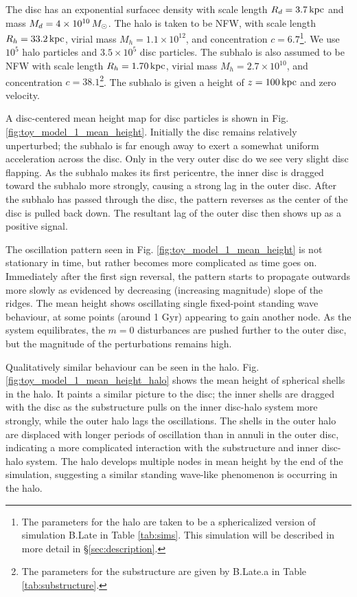 The disc has an exponential surfacec density with scale length $R_d=3.7\,\text{kpc}$ and mass $M_d=4\times10^{10} \,M_\odot$. The halo is taken to be NFW, with scale length $R_h=33.2\,\text{kpc}$, virial mass $M_h=1.1\times10^{12}$, and concentration $c=6.7$\footnote{The parameters for the halo are taken to be a sphericalized version of simulation B.Late in Table \ref{tab:sims}. This simulation will be described in more detail in \S\ref{sec:description}.}. We use $10^5$ halo particles and $3.5 \times 10^{5}$ disc particles. The subhalo is also assumed to be NFW with scale length $R_h=1.70\,\text{kpc}$, virial mass $M_h=2.7\times10^{10}$, and concentration $c=38.1$\footnote{ The parameters for the substructure are given by B.Late.a in Table \ref{tab:substructure}.}. The subhalo is given a height of $z=100\,\text{kpc}$ and zero velocity.



A disc-centered mean height map for disc particles is shown in Fig. \ref{fig:toy_model_1_mean_height}. Initially the disc remains relatively unperturbed; the subhalo is far enough away to exert a somewhat uniform acceleration across the disc. Only in the very outer disc do we see very slight disc flapping. As the subhalo makes its first pericentre, the inner disc is dragged toward the subhalo more strongly, causing a strong lag in the outer disc. After the subhalo has passed through the disc, the pattern reverses as the center of the disc is pulled back down. The resultant lag of the outer disc then shows up as a positive signal.



The oscillation pattern seen in Fig. \ref{fig:toy_model_1_mean_height} is not stationary in time, but rather becomes more complicated as time goes on. Immediately after the first sign reversal, the pattern starts to propagate outwards more slowly as evidenced by decreasing (increasing magnitude) slope of the ridges. The mean height shows oscillating single fixed-point standing wave behaviour, at some points (around 1 Gyr) appearing to gain another node.  As the system equilibrates, the $m=0$ disturbances are pushed further to the outer disc, but the magnitude of the perturbations remains high.

Qualitatively similar behaviour can be seen in the halo. Fig. \ref{fig:toy_model_1_mean_height_halo} shows the mean height of spherical shells in the halo. It paints a similar picture to the disc; the inner shells are dragged with the disc as the substructure pulls on the inner disc-halo system more strongly, while the outer halo lags the oscillations. The shells in the outer halo are displaced with longer periods of oscillation than in annuli in the outer disc, indicating a more complicated interaction with the substructure and inner disc-halo system. The halo develops multiple nodes in mean height by the end of the simulation, suggesting a similar standing wave-like phenomenon is occurring in the halo.

